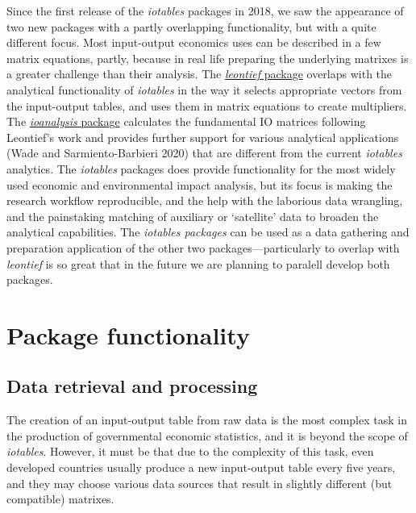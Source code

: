 \documentclass[
]{article}
\begin{document}
Since the first release of the \emph{iotables} packages in 2018, we saw
the appearance of two new packages with a partly overlapping
functionality, but with a quite different focus. Most input-output
economics uses can be described in a few matrix equations, partly,
because in real life preparing the underlying matrixes is a greater
challenge than their analysis. The
\href{https://cran.r-project.org/web/packages/leontief/}{\emph{leontief}
package} overlaps with the analytical functionality of \emph{iotables}
in the way it selects appropriate vectors from the input-output tables,
and uses them in matrix equations to create multipliers. The
\href{https://cran.r-project.org/web/packages/ioanalysis/}{\emph{ioanalysis}
package} calculates the fundamental IO matrices following Leontief's
work and provides further support for various analytical applications
(Wade and Sarmiento-Barbieri 2020) that are different from the current
\emph{iotables} analytics. The \emph{iotables} packages does provide
functionality for the most widely used economic and environmental impact
analysis, but its focus is making the research workflow reproducible,
and the help with the laborious data wrangling, and the painstaking
matching of auxiliary or `satellite' data to broaden the analytical
capabilities. The \emph{iotables packages} can be used as a data
gathering and preparation application of the other two
packages---particularly to overlap with \emph{leontief} is so great that
in the future we are planning to paralell develop both packages.

\hypertarget{package-functionality}{%
\section{Package functionality}\label{package-functionality}}

\hypertarget{data-retrieval-and-processing}{%
\subsection{Data retrieval and
processing}\label{data-retrieval-and-processing}}

The creation of an input-output table from raw data is the most complex
task in the production of governmental economic statistics, and it is
beyond the scope of \emph{iotables}. However, it must be that due to the
complexity of this task, even developed countries usually produce a new
input-output table every five years, and they may choose various data
sources that result in slightly different (but compatible) matrixes.
\end{document}

